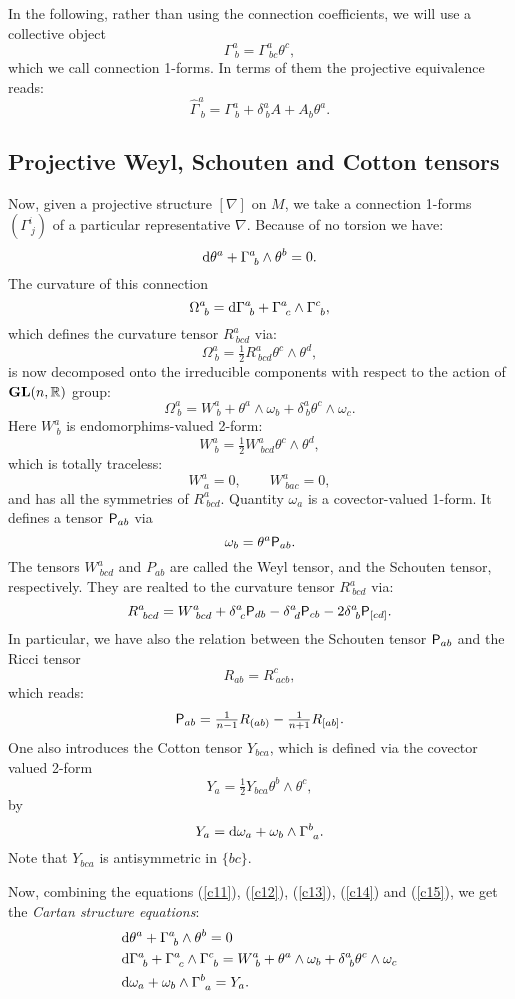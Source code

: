 \documentclass[letterpaper]{amsart}
\theoremstyle{definition}
\theoremstyle{remark}
\newcommand{\be}{\begin{equation}}
\newcommand{\ee}{\end{equation}}
\newcommand{\dz}{\wedge}
\newcommand{\der}{{\rm d}}
\newcommand{\Rho}{{\mbox{\sf P}}}
\begin{document}
In the following, rather than using the connection coefficients, we
will use a collective object
$$\Gamma^a_{~b}=\Gamma^a_{~bc}\theta^c,$$
which we call connection 1-forms. In terms of them the projective
equivalence reads:
\be
\hat{\Gamma}^a_{~b}=\Gamma^a_{~b}+\delta^a_{~b}A+A_b\theta^a.\label{pt}\ee

\subsection{Projective Weyl, Schouten and Cotton tensors}
Now, given a projective structure $[\nabla]$ on $M$, we take
a connection 1-forms $(\Gamma^i_{~j})$ of a particular representative
$\nabla$. Because of no torsion we have:
\be\der\theta^a+\Gamma^a_{~b}\dz\theta^b=0.\label{c11}\ee 
The curvature of this connection
\be\Omega^a_{~b}=\der\Gamma^a_{~b}+\Gamma^a_{~c}\dz\Gamma^c_{~b},\label{c12}\ee
which defines the curvature tensor $R^a_{~bcd}$ via:
$$\Omega^a_{~b}=\tfrac12 R^a_{~bcd}\theta^c\dz\theta^d,$$
is now decomposed onto the irreducible components with respect to the
action of $\mathbf{GL}(n,\mathbb{R})$ group:
\be
\Omega^a_{~b}=W^a_{~b}+\theta^a\dz\omega_b+\delta^a_{~b}\theta^c\dz\omega_c.\label{c13}\ee
Here $W^a_{~b}$ is endomorphims-valued 2-form:
$$W^a_{~b}=\tfrac12W^a_{~bcd}\theta^c\dz\theta^d,$$
which is totally traceless:
$$W^a_{~a}=0,\quad\quad W^a_{~bac}=0,$$
and has all the symmetries of $R^a_{~bcd}$. 
Quantity $\omega_a$ is a covector-valued 1-form. It defines a
tensor $\Rho_{ab}$ via 
\be
\omega_b=\theta^a\Rho_{ab}.\label{d1}\ee
The tensors $W^a_{~bcd}$ and $P_{ab}$ are called the Weyl tensor, and
the Schouten tensor, respectively. They are realted to the curvature
tensor $R^a_{~bcd}$ via:
$$R^a_{~bcd}=W^a_{~bcd}+\delta^a_{~c}\Rho_{db}-\delta^a_{~d}\Rho_{cb}-
2\delta^a_{~b}\Rho_{[cd]}.$$
In particular, we have also the relation between the Schouten tensor
$\Rho_{ab}$ and the Ricci tensor
$$R_{ab}=R^c_{~acb},$$ 
which reads:
\be
\Rho_{ab}=\tfrac{1}{n-1}R_{(ab)}-\tfrac{1}{n+1}R_{[ab]}.\label{c41}\ee
One also introduces the Cotton tensor $Y_{bca}$, which is defined via 
the covector valued 2-form 
\be Y_a=\tfrac12Y_{bca}\theta^b\dz\theta^c,\label{c14}\ee
by 
\be Y_a=\der\omega_a+\omega_b\dz\Gamma^b_{~a}.\label{c15}\ee
Note that $Y_{bca}$ is antisymmetric in $\{bc\}$.

Now, combining the equations (\ref{c11}), (\ref{c12}), (\ref{c13}),
(\ref{c14}) and (\ref{c15}), we get the \emph{Cartan structure
  equations}:
\be\begin{aligned}
&\der\theta^a+\Gamma^a_{~b}\dz\theta^b=0\\
&\der\Gamma^a_{~b}+\Gamma^a_{~c}\dz\Gamma^c_{~b}=
W^a_{~b}+\theta^a\dz\omega_b+\delta^a_{~b}\theta^c\dz\omega_c\\
&\der\omega_a+\omega_b\dz\Gamma^b_{~a}=Y_a.
\end{aligned}\label{cs}\ee 
\end{document}
